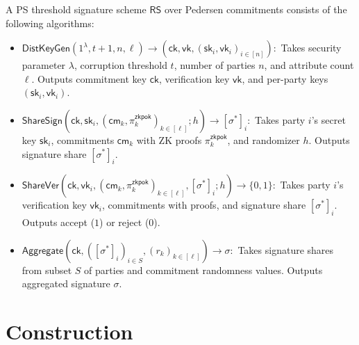 \begin{definition}
A PS threshold signature scheme $\mathsf{RS}$ over Pedersen commitments consists of the following algorithms:
\begin{itemize}
    \item $\mathsf{DistKeyGen}(1^{\lambda}, t+1, n, \ell) \to (\mathsf{ck}, \mathsf{vk}, (\mathsf{sk}_i, \mathsf{vk}_i)_{i \in [n]}):$ Takes security parameter $\lambda$, corruption threshold $t$, number of parties $n$, and attribute count $\ell$. Outputs commitment key $\mathsf{ck}$, verification key $\mathsf{vk}$, and per-party keys $(\mathsf{sk}_i, \mathsf{vk}_i)$.
    \item $\mathsf{ShareSign}(\mathsf{ck}, \mathsf{sk}_i, (\mathsf{cm}_k, \pi_k^{\mathsf{zkpok}})_{k \in [\ell]}; h) \to [\sigma^*]_i:$ Takes party $i$'s secret key $\mathsf{sk}_i$, commitments $\mathsf{cm}_k$ with ZK proofs $\pi_k^{\mathsf{zkpok}}$, and randomizer $h$. Outputs signature share $[\sigma^*]_i$.
    \item $\mathsf{ShareVer}(\mathsf{ck}, \mathsf{vk}_i, (\mathsf{cm}_k, \pi_k^{\mathsf{zkpok}})_{k \in [\ell]}, [\sigma^*]_i; h) \to \{0,1\}:$ Takes party $i$'s verification key $\mathsf{vk}_i$, commitments with proofs, and signature share $[\sigma^*]_i$. Outputs accept ($1$) or reject ($0$).
    \item $\mathsf{Aggregate}(\mathsf{ck}, ([\sigma^*]_i)_{i \in S}, (r_k)_{k \in [\ell]}) \to \sigma:$ Takes signature shares from subset $S$ of parties and commitment randomness values. Outputs aggregated signature $\sigma$.
\end{itemize}
\end{definition}

\section{Construction}
\label{sec:threshold-construction}


